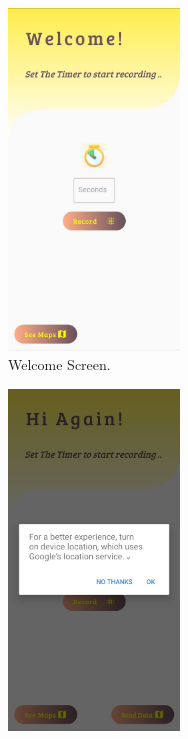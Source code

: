 \begin{figure}[h!]
    \begin{subfigure}{.50\textwidth}
        \center
        \includegraphics[width=0.50\textwidth]{Images/recordingApp/firstScreen.jpg}
        \caption{Welcome Screen.}
        \label{fig:Welcome Screen}
    \end{subfigure}
    \begin{subfigure}{.50\textwidth}
        \center
        \includegraphics[width=0.50\textwidth]{Images/recordingApp/askingGps.jpg}

\end{subfigure}
\end{figure}
